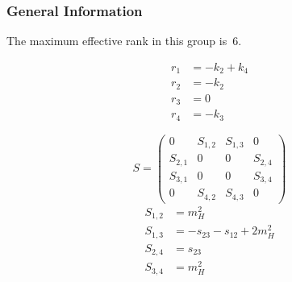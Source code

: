 \documentclass[a4paper]{article}
\begin{document}
\subsubsection*{General Information}
The maximum effective rank in this group is~6.

\begin{subequations}
\begin{align}
r_{1} &= -k_{2}+k_{4}\\
r_{2} &= -k_{2}\\
r_{3} &= 0\\
r_{4} &= -k_{3}
\end{align}
\end{subequations}

\begin{equation}
S=\left(\begin{array}{cccc}
   0&
   S_{1,2}&
   S_{1,3}&
   0\\
   S_{2,1}&
   0&
   0&
   S_{2,4}\\
   S_{3,1}&
   0&
   0&
   S_{3,4}\\
   0&
   S_{4,2}&
   S_{4,3}&
   0\end{array}\right)
\end{equation}
\begin{subequations}
\begin{align}
   S_{1,2}&=m_H^2\\
   S_{1,3}&=-s_{23}-s_{12}+2m_H^2\\
   S_{2,4}&=s_{23}\\
   S_{3,4}&=m_H^2
\end{align}
\end{subequations}
\end{document}
